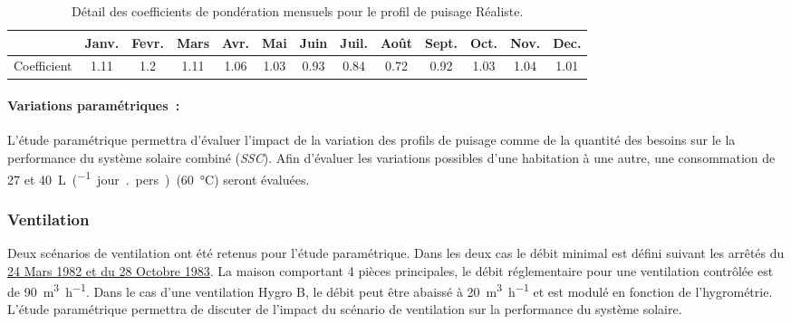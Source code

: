 \begin{table}
\centering
\begin{tabular}{l*{12}{c}}
    \toprule
                & Janv. & Fevr. & Mars & Avr. & Mai & Juin & Juil. & Août & Sept. & Oct. & Nov. & Dec. \\
    \midrule
    Coefficient & 1.11   & 1.2   & 1.11  & 1.06  & 1.03  & 0.93   & 0.84    & 0.72   & 0.92    & 1.03  & 1.04  & 1.01  \\
    \bottomrule
\end{tabular}
\caption{Détail des coefficients de pondération mensuels pour le profil de
         puisage Réaliste.}
         \label{tab:coef_mois}
\end{table}

\paragraph{Variations paramétriques~:} %
\label{par:variations_parametriques}
L’étude paramétrique permettra d’évaluer l’impact de la variation des profils de puisage
comme de la quantité des besoins sur le la performance du système solaire combiné
(\emph{SSC}). Afin d’évaluer les variations possibles d’une habitation à une autre, une
consommation de 27 et \SI{40}{\liter\per(jour {.} pers)}~(\SI{60}{\celsius}) seront évaluées.


\subsubsection{Ventilation} %
\label{ssub:ventilation}

Deux scénarios de ventilation ont été retenus pour l’étude paramétrique. Dans les deux cas
le débit minimal est défini suivant les arrêtés du
\href{https://www.legifrance.gouv.fr/affichTexte.do?cidTexte=JORFTEXT000000862344}{24 Mars
1982 et du 28 Octobre 1983}. La maison comportant 4 pièces principales, le débit réglementaire
pour une ventilation contrôlée est de \SI{90}{\meter\cubed\per\hour}. Dans le cas d’une ventilation
Hygro B, le débit peut être abaissé à \SI{20}{\meter\cubed\per\hour} et est modulé en fonction
de l’hygrométrie. L’étude paramétrique permettra de discuter de l’impact du scénario
de ventilation sur la performance du système solaire.



